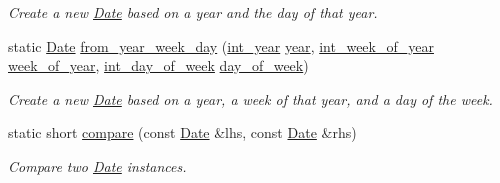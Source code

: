 \begin{DoxyCompactItemize}
\begin{DoxyCompactList}\small\item\em Create a new \hyperlink{structDate}{Date} based on a year and the day of that year. \end{DoxyCompactList}\item 
static \hyperlink{structDate}{Date} \hyperlink{structDate_a88c032d0e05efa136df450f1d3564760}{from\-\_\-year\-\_\-week\-\_\-day} (\hyperlink{types_8h_a7ff53e164374f5b24e06f3c04362e61d}{int\-\_\-year} \hyperlink{structDate_aac4f4635d8db0ea1a32c2f979a1a6cc0}{year}, \hyperlink{types_8h_af13e483c5f00ae8ea8ada4c7f5fad337}{int\-\_\-week\-\_\-of\-\_\-year} \hyperlink{structDate_af051f922cdc105f86b92fc6d8bbdfa90}{week\-\_\-of\-\_\-year}, \hyperlink{types_8h_a78b244794c680f1753a6d92eed77aeda}{int\-\_\-day\-\_\-of\-\_\-week} \hyperlink{structDate_ac85eed3a3b2d579cdc74b2af801740b0}{day\-\_\-of\-\_\-week})
\begin{DoxyCompactList}\small\item\em Create a new \hyperlink{structDate}{Date} based on a year, a week of that year, and a day of the week. \end{DoxyCompactList}\item 
static short \hyperlink{structDate_affbeb90f7db9710e090d268e3f9e772a}{compare} (const \hyperlink{structDate}{Date} \&lhs, const \hyperlink{structDate}{Date} \&rhs)
\begin{DoxyCompactList}\small\item\em Compare two \hyperlink{structDate}{Date} instances. \end{DoxyCompactList}\end{DoxyCompactItemize}
